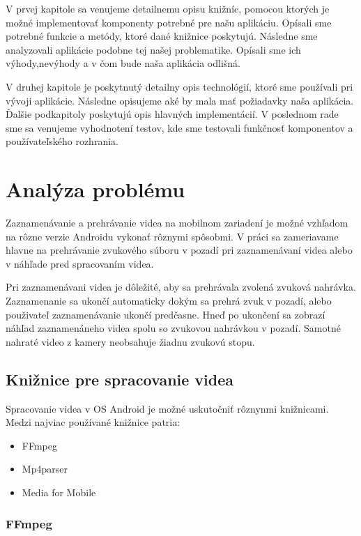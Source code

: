 \documentclass[12pt, oneside]{book}
\begin{document}
V prvej kapitole sa venujeme detailnemu opisu knižníc, pomocou ktorých je možné implementovať komponenty potrebné pre našu aplikáciu. Opísali sme potrebné funkcie a metódy, ktoré dané knižnice poskytujú. Následne sme analyzovali aplikácie podobne tej našej problematike. Opísali sme ich výhody,nevýhody a v čom bude naša aplikácia odlišná.

V druhej kapitole je poskytnutý detailny opis technológií, ktoré sme používali pri vývoji aplikácie. Následne opisujeme aké by mala mať požiadavky naša aplikácia. Ďalšie podkapitoly poskytujú opis hlavných implementácií. V poslednom rade sme sa venujeme vyhodnotení testov, kde sme testovali funkčnosť komponentov a používateľského rozhrania.


\newpage
\chapter{Analýza problému}

\hspace{15pt} Zaznamenávanie a prehrávanie videa na mobilnom zariadení je možné vzhľadom na rôzne verzie Androidu vykonať rôznymi spôsobmi. V práci sa zameriavame hlavne na prehrávanie zvukového súboru v pozadí pri zaznamenávaní videa alebo v náhľade pred spracovaním videa. 

\hspace{15pt} Pri zaznamenávani videa je dôležité, aby sa prehrávala zvolená zvuková nahrávka. Zaznamenanie sa ukončí automaticky dokým sa prehrá zvuk v pozadí, alebo použivateľ zaznamenávanie ukončí predčasne. Hneď po ukončení sa zobrazí náhľad zaznamenáneho videa spolu so zvukovou nahrávkou v pozadí. Samotné nahraté video z kamery neobsahuje žiadnu zvukovú stopu. 

\section{Knižnice pre spracovanie videa}

\hspace{15pt} Spracovanie videa v OS Android je možné uskutočniť rôznynmi knižnicami. Medzi najviac používané knižnice patria:
\begin{itemize}
\item FFmpeg
\item Mp4parser
\item Media for Mobile
\end{itemize}

\subsection{FFmpeg}
\end{document}
